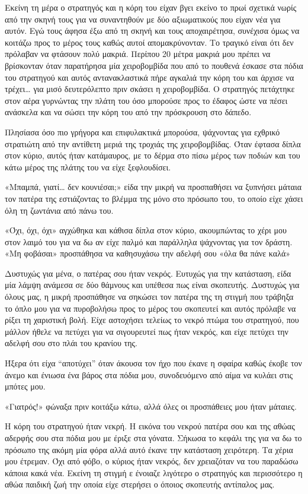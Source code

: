 \documentclass[12pt,twoside, openany]{book}
\begin{document}
Εκείνη τη μέρα ο στρατηγός και η κόρη του είχαν βγει εκείνο το πρωί σχετικά νωρίς από την σκηνή τους για να συναντηθούν με δύο αξιωματικούς που είχαν νέα για αυτόν. Εγώ τους άφησα έξω από τη σκηνή και τους αποχαιρέτησα, συνέχισα όμως να κοιτάζω προς το μέρος τους καθώς αυτοί απομακρύνονταν. Το τραγικό είναι ότι δεν πρόλαβαν να φτάσουν πολύ μακριά. Περίπου 20 μέτρα μακριά μου πρέπει να βρίσκονταν όταν παρατήρησα μία χειροβομβίδα που από το πουθενά έσκασε στα πόδια του στρατηγού και αυτός αντανακλαστικά πήρε αγκαλιά την κόρη του και άρχισε να τρέχει… για μισό δευτερόλεπτο πριν σκάσει η χειροβομβίδα. Ο στρατηγός πετάχτηκε στον αέρα γυρνώντας την πλάτη του όσο μπορούσε προς το έδαφος ώστε να πέσει ανάσκελα και να σώσει την κόρη του από την πρόσκρουση στο δάπεδο.

Πλησίασα όσο πιο γρήγορα και επιφυλακτικά μπορούσα, ψάχνοντας για εχθρικό στρατιώτη από την αντίθετη μεριά της τροχιάς της χειροβομβίδας. Όταν έφτασα δίπλα στον κύριο, αυτός ήταν κατάμαυρος, με το δέρμα στο πίσω μέρος των ποδιών και του κάτω μέρος της πλάτης του να είχε ξεφλουδίσει. 

«Μπαμπά, γιατί… δεν κουνιέσαι;» είδα την μικρή να προσπαθήσει να ξυπνήσει μάταια τον πατέρα της εστιάζοντας το βλέμμα της μόνο στο πρόσωπο του, το οποίο είχε χάσει όλη τη ζωντάνια από πάνω του.

«Όχι, όχι, όχι» αγχώθηκα και κάθισα δίπλα στον κύριο, ακουμπώντας το χέρι μου στον λαιμό του για να δω αν είχε παλμό και παράλληλα ψάχνοντας για τον δράστη. «Μη φοβάσαι» προσπάθησα να καθησυχάσω την αδελφή σου «όλα θα πάνε καλά» 

Δυστυχώς για μένα, ο πατέρας σου ήταν νεκρός. Ευτυχώς για την κατάσταση, είδα μία λάμψη ανάμεσα σε δύο θάμνους και υπέθεσα πως είναι σκοπευτής. Δυστυχώς για όλους μας, η μικρή προσπάθησε να σηκώσει τον πατέρα της τη στιγμή που τράβηξα το όπλο μου για να πυροβολήσω προς το μέρος του σκοπευτεί και αυτός πρόλαβε να ρίξει τη χαριστική βολή. Είχε αστοχήσει τελείως το νεκρό πτώμα του στρατηγού, που μάλλον ήθελε να πετύχει για να σιγουρευτεί πως ήταν νεκρός, και είχε πετύχει την αδελφή σου στο πλάι του κρανίου της.

Ήξερα ότι είχα “αποτύχει” όταν άκουσα τον ήχο που έκανε η σφαίρα καθώς έκοβε τον άνεμο και ένιωσα ένα βάρος στα πόδια μου, συνοδευόμενο από αίμα να κυλάει στις μπότες μου.

«Γιατρός!» φώναξα πριν κοιτάξω κάτω, αλλά όλες οι προσπάθειες μου ήταν μάταιες.

Η κόρη του στρατηγού ήταν νεκρή. Η εικόνα του νεκρού πατέρα σου και της αθώας αδερφής σου στα πόδια μου με έριξε στα γόνατα. Σήκωσα το κεφάλι της για να δω το πρόσωπο της ακόμη μία φόρα αλλά αυτό έκανε την κατάσταση χειρότερη. Τα χέρια μου έτρεμαν. Όχι από φόβο, ο κύριος ήταν νεκρός, δεν χρειαζόταν να του παραδώσω κάποια κακά νέα. Εκείνη τη στιγμή ε ένοιαζε λιγότερο ο στρατηγός και περισσότερο η αθώα παιδική ζωή την οποία είχε στερήσει ο όποιος σκοπευτής αντίπαλος μας.
\end{document}
